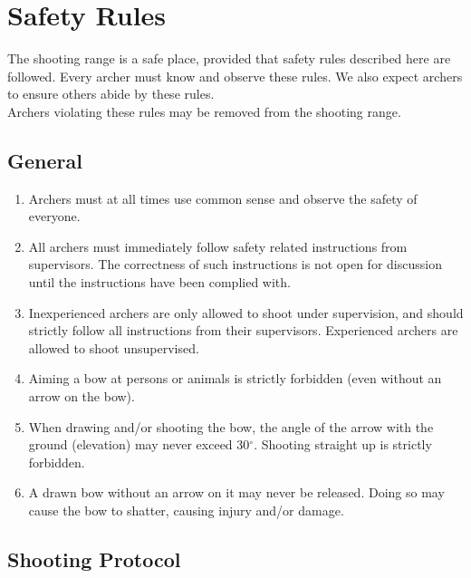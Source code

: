 \documentclass[a4paper]{article}
\begin{document}
\pagebreak

\section{Safety Rules}
The shooting range is a safe place, provided that safety rules described here are followed. Every archer must know and observe these rules. We also expect archers to ensure others abide by these rules. \\

Archers violating these rules may be removed from the shooting range. \\

\subsection{General}

\begin{enumerate}
  \item Archers must at all times use common sense and observe the safety of everyone.
  \item All archers must immediately follow safety related instructions from supervisors. The correctness of such instructions is not open for discussion until the instructions have been complied with.
  \item Inexperienced archers are only allowed to shoot under supervision, and should strictly follow all instructions from their supervisors. Experienced archers are allowed to shoot unsupervised.
  \item Aiming a bow at persons or animals is strictly forbidden (even without an arrow on the bow).
  \item When drawing and/or shooting the bow, the angle of the arrow with the ground (elevation) may never exceed 30$^\circ$. Shooting straight up is strictly forbidden.
  \item A drawn bow without an arrow on it may never be released. Doing so may cause the bow to shatter, causing injury and/or damage.
\end{enumerate}

\subsection{Shooting Protocol}
\end{document}
